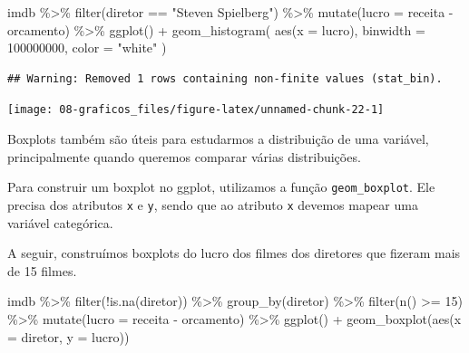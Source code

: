 \documentclass[
]{book}
\newenvironment{Shaded}{\begin{snugshade}}{\end{snugshade}}
\newcommand{\AttributeTok}[1]{\textcolor[rgb]{0.77,0.63,0.00}{#1}}
\newcommand{\DecValTok}[1]{\textcolor[rgb]{0.00,0.00,0.81}{#1}}
\newcommand{\FunctionTok}[1]{\textcolor[rgb]{0.00,0.00,0.00}{#1}}
\newcommand{\NormalTok}[1]{#1}
\newcommand{\SpecialCharTok}[1]{\textcolor[rgb]{0.00,0.00,0.00}{#1}}
\newcommand{\StringTok}[1]{\textcolor[rgb]{0.31,0.60,0.02}{#1}}
\begin{document}
\begin{Shaded}
\begin{Highlighting}[]
\NormalTok{imdb }\SpecialCharTok{\%\textgreater{}\%} 
  \FunctionTok{filter}\NormalTok{(diretor }\SpecialCharTok{==} \StringTok{"Steven Spielberg"}\NormalTok{) }\SpecialCharTok{\%\textgreater{}\%}
  \FunctionTok{mutate}\NormalTok{(}\AttributeTok{lucro =}\NormalTok{ receita }\SpecialCharTok{{-}}\NormalTok{ orcamento) }\SpecialCharTok{\%\textgreater{}\%} 
  \FunctionTok{ggplot}\NormalTok{() }\SpecialCharTok{+}
  \FunctionTok{geom\_histogram}\NormalTok{(}
    \FunctionTok{aes}\NormalTok{(}\AttributeTok{x =}\NormalTok{ lucro), }
    \AttributeTok{binwidth =} \DecValTok{100000000}\NormalTok{,}
    \AttributeTok{color =} \StringTok{"white"}
\NormalTok{  )}
\end{Highlighting}
\end{Shaded}

\begin{verbatim}
## Warning: Removed 1 rows containing non-finite values (stat_bin).
\end{verbatim}

\begin{center}\texttt{[image: 08-graficos\_files/figure-latex/unnamed-chunk-22-1]} \end{center}

Boxplots também são úteis para estudarmos a distribuição de uma variável, principalmente quando queremos comparar várias distribuições.

Para construir um boxplot no ggplot, utilizamos a função \texttt{geom\_boxplot}. Ele precisa dos atributos \texttt{x} e \texttt{y}, sendo que ao atributo \texttt{x} devemos mapear uma variável categórica.

A seguir, construímos boxplots do lucro dos filmes dos diretores que fizeram mais de 15 filmes.

\begin{Shaded}
\begin{Highlighting}[]
\NormalTok{imdb }\SpecialCharTok{\%\textgreater{}\%} 
  \FunctionTok{filter}\NormalTok{(}\SpecialCharTok{!}\FunctionTok{is.na}\NormalTok{(diretor)) }\SpecialCharTok{\%\textgreater{}\%}
  \FunctionTok{group\_by}\NormalTok{(diretor) }\SpecialCharTok{\%\textgreater{}\%} 
  \FunctionTok{filter}\NormalTok{(}\FunctionTok{n}\NormalTok{() }\SpecialCharTok{\textgreater{}=} \DecValTok{15}\NormalTok{) }\SpecialCharTok{\%\textgreater{}\%} 
  \FunctionTok{mutate}\NormalTok{(}\AttributeTok{lucro =}\NormalTok{ receita }\SpecialCharTok{{-}}\NormalTok{ orcamento) }\SpecialCharTok{\%\textgreater{}\%} 
  \FunctionTok{ggplot}\NormalTok{() }\SpecialCharTok{+}
  \FunctionTok{geom\_boxplot}\NormalTok{(}\FunctionTok{aes}\NormalTok{(}\AttributeTok{x =}\NormalTok{ diretor, }\AttributeTok{y =}\NormalTok{ lucro))}
\end{Highlighting}
\end{Shaded}
\end{document}
